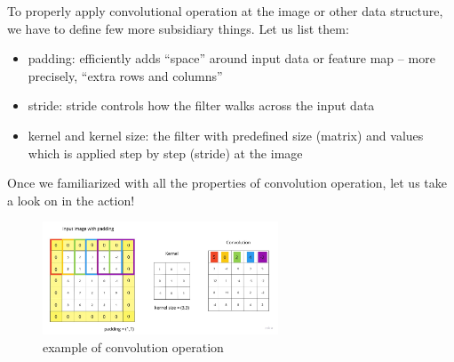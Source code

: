 To properly apply convolutional operation at the image or other data structure, we have to define few more subsidiary things. Let us list them:
\begin{itemize}
    \item padding: efficiently adds “space” around input data or feature map – more precisely, “extra rows and columns” 
    \item stride: stride controls how the filter walks across the input data
    \item kernel and kernel size: the filter with predefined size (matrix) and values which is applied step by step (stride) at the image
\end{itemize}

Once we familiarized with all the properties of convolution operation, let us take a look on in the action!  

\begin{figure}[h]
    \centering \includegraphics[width=7cm]{images/convolution.jpg}
    \caption {example of convolution operation}
\end{figure}